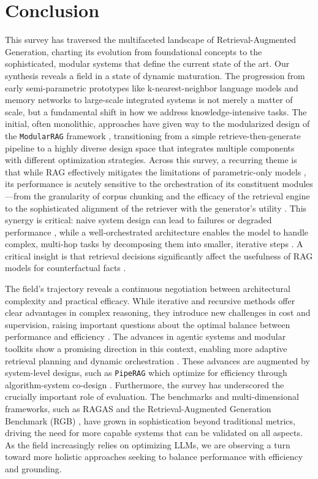 \documentclass[11pt,a4paper]{article}
\begin{document}
\section{Conclusion}


This survey has traversed the multifaceted landscape of Retrieval-Augmented Generation, charting its evolution from foundational concepts to the sophisticated, modular systems that define the current state of the art. Our synthesis reveals a field in a state of dynamic maturation. The progression from early semi-parametric prototypes like k-nearest-neighbor language models and memory networks \cite{arxiv:1612.04426v1} to large-scale integrated systems \cite{arxiv:2005.11401v4} is not merely a matter of scale, but a fundamental shift in how we address knowledge-intensive tasks. The initial, often monolithic, approaches have given way to the modularized design of the \texttt{ModularRAG} framework \cite{arxiv:2407.21059v1}, transitioning from a simple retrieve-then-generate pipeline to a highly diverse design space that integrates multiple components with different optimization strategies. Across this survey, a recurring theme is that while RAG effectively mitigates the limitations of parametric-only models \cite{arxiv:2312.05934v3}, its performance is acutely sensitive to the orchestration of its constituent modules---from the granularity of corpus chunking \cite{arxiv:2402.05131v3} and the efficacy of the retrieval engine to the sophisticated alignment of the retriever with the generator's utility \cite{arxiv:2404.13781v1}. This synergy is critical: naive system design can lead to failures or degraded performance \cite{arxiv:2401.05856v1}, while a well-orchestrated architecture enables the model to handle complex, multi-hop tasks by decomposing them into smaller, iterative steps \cite{arxiv:2305.15294v2}. A critical insight is that retrieval decisions significantly affect the usefulness of RAG models for counterfactual facts \cite{arxiv:2212.10511v4}.

The field's trajectory reveals a continuous negotiation between architectural complexity and practical efficacy. While iterative and recursive methods offer clear advantages in complex reasoning, they introduce new challenges in cost and supervision, raising important questions about the optimal balance between performance and efficiency \cite{arxiv:2305.06983v2}. The advances in agentic systems and modular toolkits show a promising direction in this context, enabling more adaptive retrieval planning and dynamic orchestration \cite{arxiv:2407.21059v1,arxiv:2405.13576v1}. These advances are augmented by system-level designs, such as \texttt{PipeRAG} which optimize for efficiency through algorithm-system co-design \cite{arxiv:2403.05676v1}. Furthermore, the survey has underscored the crucially important role of evaluation. The benchmarks and multi-dimensional frameworks, such as RAGAS \cite{arxiv:2309.15217v1} and the Retrieval-Augmented Generation Benchmark (RGB) \cite{arxiv:2309.01431v2}, have grown in sophistication beyond traditional metrics, driving the need for more capable systems that can be validated on all aspects. As the field increasingly relies on optimizing LLMs, we are observing a turn toward more holistic approaches seeking to balance performance with efficiency and grounding.
\end{document}
